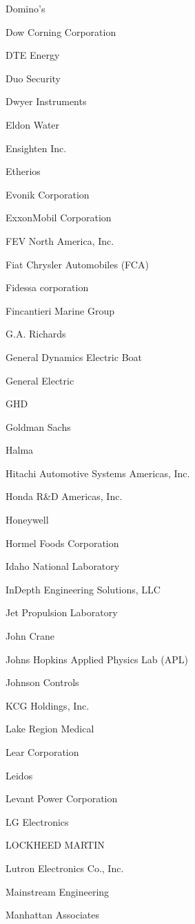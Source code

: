 \documentclass[twoside]{article}
\begin{document}
\begin{center}
\begin{multicols}{5}
\begin{FlushLeft}
\begin{compactitem}
\item Domino's
\item Dow Corning Corporation
\item DTE Energy
\item Duo Security
\item Dwyer Instruments
\item Eldon Water
\item Ensighten Inc.
\item Etherios
\item Evonik Corporation
\item ExxonMobil Corporation
\item FEV North America, Inc.
\item Fiat Chrysler Automobiles (FCA)
\item Fidessa corporation
\item Fincantieri Marine Group
\item G.A. Richards
\item General Dynamics Electric Boat
\item General Electric
\item GHD
\item Goldman Sachs
\item Halma
\item Hitachi Automotive Systems Americas, Inc.
\item Honda R\&D Americas, Inc.
\item Honeywell
\item Hormel Foods Corporation
\item Idaho National Laboratory
\item InDepth Engineering Solutions, LLC
\item Jet Propulsion Laboratory
\item John Crane
\item Johns Hopkins Applied Physics Lab (APL)
\item Johnson Controls
\item KCG Holdings, Inc.
\item Lake Region Medical
\item Lear Corporation
\item Leidos
\item Levant Power Corporation
\item LG Electronics
\item LOCKHEED MARTIN
\item Lutron Electronics Co., Inc.
\item Mainstream Engineering
\item Manhattan Associates

\end{compactitem}
\end{FlushLeft}
\end{multicols}
\end{center}
\end{document}
